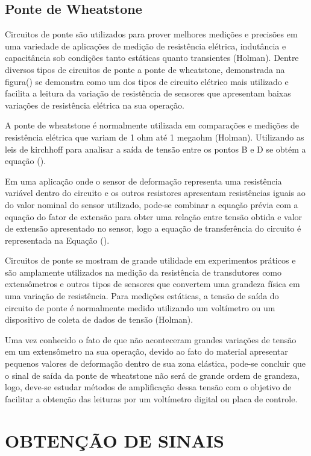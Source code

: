 \subsection{Ponte de Wheatstone}

Circuitos de ponte são utilizados para prover melhores medições e precisões em uma variedade de aplicações de medição de resistência elétrica, indutância e capacitância sob condições tanto estáticas quanto transientes (Holman). Dentre diversos tipos de circuitos de ponte a ponte de wheatstone, demonstrada na figura() se demonstra como um dos tipos de circuito elétrico mais utilizado e facilita a leitura da variação de resistência de sensores que apresentam baixas variações de resistência elétrica na sua operação.

A ponte de wheatstone é normalmente utilizada em comparações e medições de resistência elétrica que variam de 1 ohm até 1 megaohm (Holman). Utilizando as leis de kirchhoff para analisar a saída de tensão entre os pontos B e D se obtém a equação ().

Em uma aplicação onde o sensor de deformação representa uma resistência variável dentro do circuito e os outros resistores apresentam resistências iguais ao do valor nominal do sensor utilizado, pode-se combinar a equação prévia com a equação do fator de extensão para obter uma relação entre tensão obtida e valor de extensão apresentado no sensor, logo a equação de transferência do circuito é representada na Equação ().

Circuitos de ponte se mostram de grande utilidade em experimentos práticos e são amplamente utilizados na medição da resistência de transdutores como extensômetros e outros tipos de sensores que convertem uma grandeza física em uma variação de resistência. Para medições estáticas, a tensão de saída do circuito de ponte é normalmente medido utilizando um voltímetro ou um dispositivo de coleta de dados de tensão (Holman).

Uma vez conhecido o fato de que não aconteceram grandes variações de tensão em um extensômetro na sua operação, devido ao fato do material apresentar pequenos valores de deformação dentro de sua zona elástica, pode-se concluir que o sinal de saída da ponte de wheatstone não será de grande ordem de grandeza, logo, deve-se estudar métodos de amplificação dessa tensão com o objetivo de facilitar a obtenção das leituras por um voltímetro digital ou placa de controle.

\section{OBTENÇÃO DE SINAIS}

